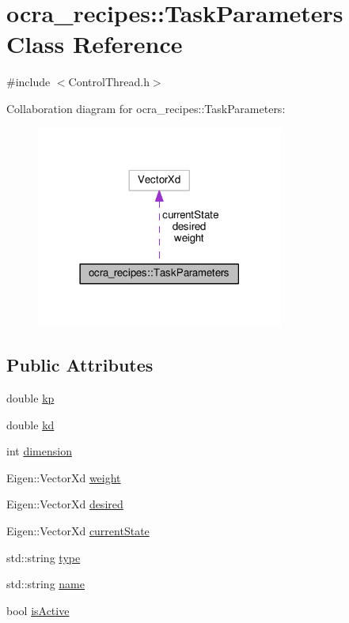 \hypertarget{classocra__recipes_1_1TaskParameters}{}\section{ocra\+\_\+recipes\+:\+:Task\+Parameters Class Reference}
\label{classocra__recipes_1_1TaskParameters}


{\ttfamily \#include $<$Control\+Thread.\+h$>$}



Collaboration diagram for ocra\+\_\+recipes\+:\+:Task\+Parameters\+:
\nopagebreak
\begin{figure}[H]
\begin{center}
\leavevmode
\includegraphics[width=230pt]{d3/dc8/classocra__recipes_1_1TaskParameters__coll__graph}
\end{center}
\end{figure}
\subsection*{Public Attributes}
\begin{DoxyCompactItemize}
\item 
double \hyperlink{classocra__recipes_1_1TaskParameters_a644ed196f6bf867e46d7faab9ac287b3}{kp}
\item 
double \hyperlink{classocra__recipes_1_1TaskParameters_a8a90d9db17c0faeb26624899264eec9e}{kd}
\item 
int \hyperlink{classocra__recipes_1_1TaskParameters_a9102d4eee6b4dedb4bfb9181d348ed9c}{dimension}
\item 
Eigen\+::\+Vector\+Xd \hyperlink{classocra__recipes_1_1TaskParameters_aa960ee789e002d17f148a67cb8b35251}{weight}
\item 
Eigen\+::\+Vector\+Xd \hyperlink{classocra__recipes_1_1TaskParameters_a1dbe7dbb189079f4c8b7cd8f60a3b33e}{desired}
\item 
Eigen\+::\+Vector\+Xd \hyperlink{classocra__recipes_1_1TaskParameters_a323bf15f03055fcbf07f865ba9074381}{current\+State}
\item 
std\+::string \hyperlink{classocra__recipes_1_1TaskParameters_a8c62a820309b362ba4ce8c515a66aff4}{type}
\item 
std\+::string \hyperlink{classocra__recipes_1_1TaskParameters_a8d9b23fed4d4207bed2b48625acb8910}{name}
\item 
bool \hyperlink{classocra__recipes_1_1TaskParameters_a1e4df01753f82bc359f9632817e61e2b}{is\+Active}
\end{DoxyCompactItemize}
